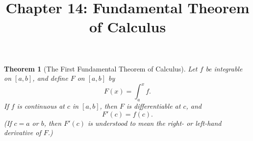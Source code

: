 \documentclass{article}
\newtheorem{theorem}{Theorem}
\begin{document}
\title{Chapter 14: Fundamental Theorem of Calculus}
\maketitle

\begin{theorem}[The First Fundamental Theorem of Calculus]
  Let $f$ be integrable on $[a, b]$, and define $F$ on $[a, b]$ by
  \begin{equation*}
    F(x) = \int_a^x f.
  \end{equation*} If $f$ is continuous at $c$ in $[a, b]$, then $F$ is
  differentiable at $c$, and \begin{equation*}
    F'(c) = f(c).
  \end{equation*} (If $c = a$ or $b$, then $F'(c)$ is understood to mean the
  right- or left-hand derivative of $F$.)
\end{theorem}
\end{document}
